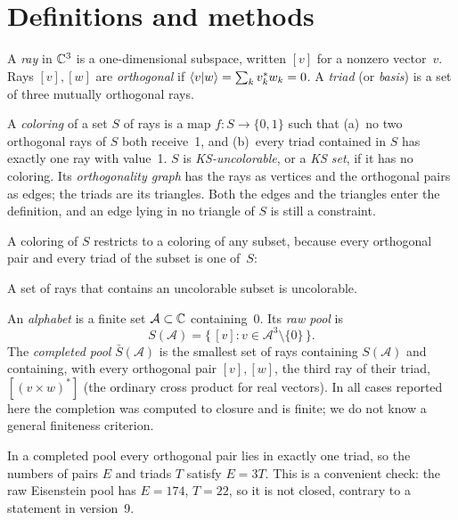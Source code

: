 \section{Definitions and methods}\label{sec:prelim}

\begin{definition}
A \emph{ray} in $\mathbb{C}^3$ is a one-dimensional subspace, written $[v]$ for a nonzero vector~$v$.
Rays $[v],[w]$ are \emph{orthogonal} if $\langle v|w\rangle=\sum_k v_k^{*}w_k=0$.  A \emph{triad} (or
\emph{basis}) is a set of three mutually orthogonal rays.
\end{definition}

\begin{definition}
A \emph{coloring} of a set $S$ of rays is a map $f:S\to\{0,1\}$ such that (a)~no two orthogonal
rays of $S$ both receive~1, and (b)~every triad contained in $S$ has exactly one ray with value~1.
$S$ is \emph{KS-uncolorable}, or a \emph{KS set}, if it has no coloring.  Its \emph{orthogonality
graph} has the rays as vertices and the orthogonal pairs as edges; the triads are its triangles.
Both the edges and the triangles enter the definition, and an edge lying in no triangle of $S$
is still a constraint.
\end{definition}

A coloring of $S$ restricts to a coloring of any subset, because every orthogonal pair and every
triad of the subset is one of~$S$:

\begin{lemma}[Restriction]\label{lem:restrict}
A set of rays that contains an uncolorable subset is uncolorable.
\end{lemma}

\begin{definition}
An \emph{alphabet} is a finite set $\mathcal A\subset\mathbb{C}$ containing~0.  Its \emph{raw pool} is
\[
S(\mathcal A)=\{\,[v]: v\in\mathcal A^3\setminus\{0\}\,\}.
\]
The \emph{completed pool} $\bar S(\mathcal A)$ is the smallest set of rays containing
$S(\mathcal A)$ and containing, with every orthogonal pair $[v],[w]$, the third ray of their
triad, $[(v\times w)^{*}]$ (the ordinary cross product for real vectors).  In all cases reported
here the completion was computed to closure and is finite; we do not know a general finiteness
criterion.
\end{definition}

In a completed pool every orthogonal pair lies in exactly one triad, so the numbers of pairs $E$
and triads $T$ satisfy $E=3T$.  This is a convenient check: the raw Eisenstein pool has
$E=174$, $T=22$, so it is not closed, contrary to a statement in version~9.

